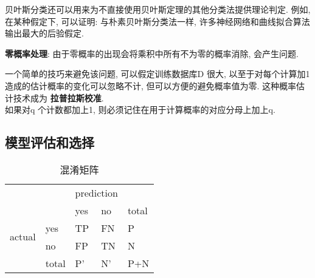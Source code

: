\documentclass{article}
\begin{document}
贝叶斯分类还可以用来为不直接使用贝叶斯定理的其他分类法提供理论判定. 
例如, 在某种假定下, 可以证明: 与朴素贝叶斯分类法一样, 许多神经网络和曲线拟合算法输出最大的后验假定.

\bigskip
\textbf{零概率处理}: 由于零概率的出现会将乘积中所有不为零的概率消除, 会产生问题.

一个简单的技巧来避免该问题, 可以假定训练数据库D 很大, 以至于对每个计算加1 造成的估计概率的变化可以忽略不计, 但可以方便的避免概率值为零. 这种概率估计技术成为
\textbf{拉普拉斯校准}.\\
如果对q 个计数都加上1, 则必须记住在用于计算概率的对应分母上加上q.

\subsection{模型评估和选择}
\begin{table}[htbp]
\centering
\caption{混淆矩阵}
\begin{tabular}{|lllll|}
\hline
       &      & \multicolumn{2}{c}{prediction}  &   \\
       &       & yes        & no & total \\
\multirow{2}{*}{actual}   & yes   & TP   & FN & P     \\
       & no    & FP         & TN & N     \\
       & total & P'         & N' & P+N   \\
\hline
\end{tabular}
\end{table}
\end{document}
